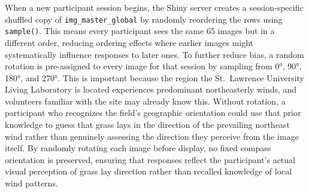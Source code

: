 \documentclass[
]{article}
\newenvironment{Shaded}{\begin{snugshade}}{\end{snugshade}}
\newcommand{\AttributeTok}[1]{\textcolor[rgb]{0.40,0.45,0.13}{#1}}
\newcommand{\CommentTok}[1]{\textcolor[rgb]{0.37,0.37,0.37}{#1}}
\newcommand{\ConstantTok}[1]{\textcolor[rgb]{0.56,0.35,0.01}{#1}}
\newcommand{\FunctionTok}[1]{\textcolor[rgb]{0.28,0.35,0.67}{#1}}
\newcommand{\NormalTok}[1]{\textcolor[rgb]{0.00,0.23,0.31}{#1}}
\newcommand{\OtherTok}[1]{\textcolor[rgb]{0.00,0.23,0.31}{#1}}
\newcommand{\SpecialCharTok}[1]{\textcolor[rgb]{0.37,0.37,0.37}{#1}}
\newcommand{\StringTok}[1]{\textcolor[rgb]{0.13,0.47,0.30}{#1}}
\begin{document}
\begin{Shaded}
\end{Shaded}

When a new participant session begins, the Shiny server creates a
session-specific shuffled copy of \texttt{img\_master\_global} by
randomly reordering the rows using \texttt{sample()}. This means every
participant sees the same 65 images but in a different order, reducing
ordering effects where earlier images might systematically influence
responses to later ones. To further reduce bias, a random rotation is
pre-assigned to every image for that session by sampling from 0°, 90°,
180°, and 270°. This is important because the region the St.~Lawrence
University Living Laboratory is located experiences predominant
northeasterly winds, and volunteers familiar with the site may already
know this. Without rotation, a participant who recognizes the field's
geographic orientation could use that prior knowledge to guess that
grass lays in the direction of the prevailing northeast wind rather than
genuinely assessing the direction they perceive from the image itself.
By randomly rotating each image before display, no fixed compass
orientation is preserved, ensuring that responses reflect the
participant's actual visual perception of grass lay direction rather
than recalled knowledge of local wind patterns.
\end{document}
